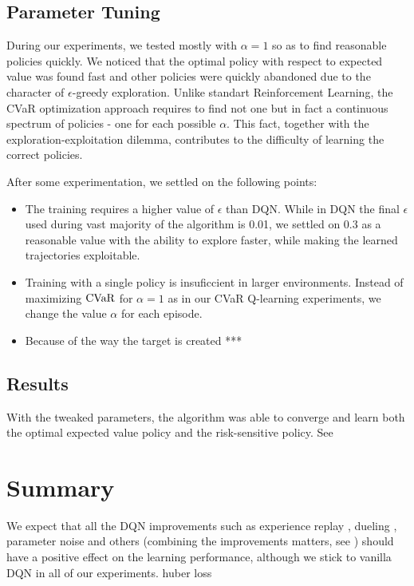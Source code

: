 \subsection{Parameter Tuning}
During our experiments, we tested mostly with $\alpha=1$ so as to find reasonable policies quickly. We noticed that the optimal policy with respect to expected value was found fast and other policies were quickly abandoned due to the character of $\epsilon$-greedy exploration. Unlike standart Reinforcement Learning, the CVaR optimization approach requires to find not one but in fact a continuous spectrum of policies - one for each possible $\alpha$. 
This fact, together with the exploration-exploitation dilemma, contributes to the difficulty of learning the correct policies.

After some experimentation, we settled on the following points: 

\begin{itemize}
\item The training requires a higher value of $\epsilon$ than DQN. While in DQN the final $\epsilon$ used during vast majority of the algorithm is 0.01, we settled on $0.3$ as a reasonable value with the ability to explore faster, while making the learned trajectories exploitable.

\item Training with a single policy is insuficcient in larger environments. Instead of maximizing $\text{CVaR}$ for $\alpha=1$ as in our CVaR Q-learning experiments, we change the value $\alpha$ for each episode.

\item Because of the way the target is created ***
\end{itemize}


\subsection{Results}

With the tweaked parameters, the algorithm was able to converge and learn both the optimal expected value policy and the risk-sensitive policy. See 

\section{Summary}
We expect that all the DQN improvements such as experience replay \citep{hessel2017rainbow}, dueling \citep{wang2015dueling}, parameter noise \citep{plappert2017parameter} and others (combining the improvements matters, see \citep{hessel2017rainbow}) should have a positive effect on the learning performance, although we stick to vanilla DQN in all of our experiments. huber loss

